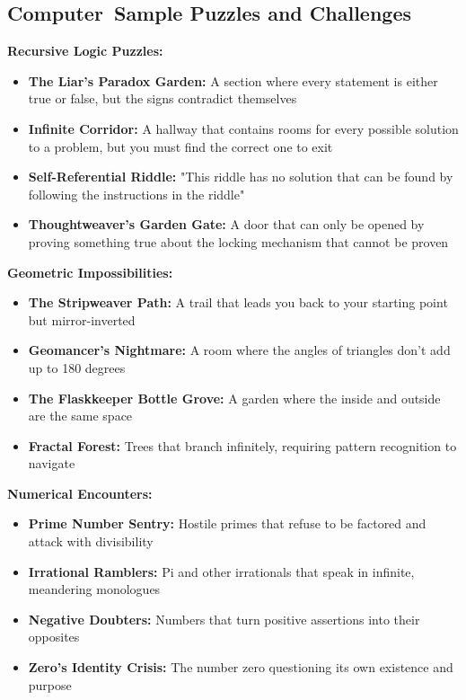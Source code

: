 \documentclass[11pt]{article}
\begin{document}
\subsection*{\faCrystal Computer\ Sample Puzzles and Challenges}

\textbf{Recursive Logic Puzzles:}
\begin{itemize}
    \item \textbf{The Liar's Paradox Garden:} A section where every statement is either true or false, but the signs contradict themselves
    \item \textbf{Infinite Corridor:} A hallway that contains rooms for every possible solution to a problem, but you must find the correct one to exit
    \item \textbf{Self-Referential Riddle:} "This riddle has no solution that can be found by following the instructions in the riddle"
    \item \textbf{Thoughtweaver's Garden Gate:} A door that can only be opened by proving something true about the locking mechanism that cannot be proven
\end{itemize}

\textbf{Geometric Impossibilities:}
\begin{itemize}
    \item \textbf{The Stripweaver Path:} A trail that leads you back to your starting point but mirror-inverted
    \item \textbf{Geomancer's Nightmare:} A room where the angles of triangles don't add up to 180 degrees
    \item \textbf{The Flaskkeeper Bottle Grove:} A garden where the inside and outside are the same space
    \item \textbf{Fractal Forest:} Trees that branch infinitely, requiring pattern recognition to navigate
\end{itemize}

\textbf{Numerical Encounters:}
\begin{itemize}
    \item \textbf{Prime Number Sentry:} Hostile primes that refuse to be factored and attack with divisibility
    \item \textbf{Irrational Ramblers:} Pi and other irrationals that speak in infinite, meandering monologues
    \item \textbf{Negative Doubters:} Numbers that turn positive assertions into their opposites
    \item \textbf{Zero's Identity Crisis:} The number zero questioning its own existence and purpose
\end{itemize}
\end{document}
